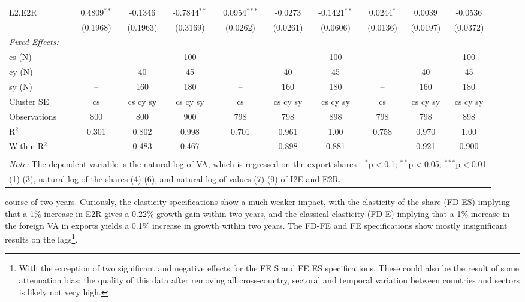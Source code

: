 \documentclass[a4paper]{article}
\begin{document}
\begin{table}[h!]
{\begin{tabular}[t]{lccccccccc}
L2.E2R&0.4809$^{**}$ & -0.1346 & -0.7844$^{**}$ & 0.0954$^{***}$ & -0.0273 & -0.1421$^{**}$ & 0.0244$^{*}$ & 0.0039 & -0.0536\\
  &(0.1968) & (0.1963) & (0.3169) & (0.0262) & (0.0261) & (0.0606) & (0.0136) & (0.0197) & (0.0372)\\%
\midrule \emph{Fixed-Effects:} &   &   &   &   &   &  \\
cs (N) & -- & -- & 100 & -- & -- & 100 & -- & -- & 100\\
cy (N) & -- & 40 & 45 & -- & 40 & 45 & -- & 40 & 45\\
sy (N) & -- & 160 & 180 & -- & 160 & 180 & -- & 160 & 180\\
\midrule
Cluster SE & cs & cs cy sy & cs cy sy & cs & cs cy sy & cs cy sy & cs & cs cy sy & cs cy sy\\
Observations & 800&800&900&798&798&898&798&798&898\\
R$^2$ & 0.301&0.802&0.998&0.701&0.961&1.00&0.758&0.970&1.00\\
Within R$^2$ & &0.483&0.467&&0.898&0.881&&0.921&0.900\\ \bottomrule \\[-1em]
\multicolumn{7}{l}{\small \textit{Note:} The dependent variable is the natural log of VA, which is regressed on the  export shares}   & \multicolumn{3}{r}{$^{*}$p$<$0.1; $^{**}$p$<$0.05; $^{***}$p$<$0.01} \\ [-0.2em]
\multicolumn{10}{l}{\small \quad \quad \quad (1)-(3), natural log of the shares (4)-(6), and natural log of values (7)-(9) of I2E and E2R.} \\
\end{tabular}
}
\end{table}
\FloatBarrier

\noindent course of two years. Curiously, the elasticity specifications show a much weaker impact, with the elasticity of the share (FD-ES) implying that a 1\% increase in E2R gives a 0.22\% growth gain within two years, and the classical elasticity (FD E) implying that a 1\% increase in the foreign VA in exports yields a 0.1\% increase in growth within two years. The FD-FE and FE specifications show mostly insignificant results on the lags\footnote{With the exception of two significant and negative effects for the FE S and FE ES specifications. These could also be the result of some attenuation bias; the quality of this data after removing all cross-country, sectoral and temporal variation between countries and sectors is likely not very high.}. \newline
\end{document}
